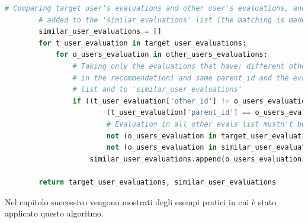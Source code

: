 \begin{itemize}
    \begin{lstlisting}[language=Python, label=lst:UB_CF_4]
        # Comparing target user's evaluations and other user's evaluations, and if there is a match the evaluation is
        # added to the 'similar_evaluations' list (the matching is made comparing the 'parent_id')
        similar_user_evaluations = []
        for t_user_evaluation in target_user_evaluations:
            for o_users_evaluation in other_users_evaluations:
                # Taking only the evaluations that have: different other_id (excluding the target evaluation
                # in the recommendation) and same parent_id and the evaluations that weren't added to 'target_user_evaluations'
                # list and to 'similar_user_evaluations'
                if ((t_user_evaluation['other_id'] != o_users_evaluation['other_id']) and  # Evaluations must have different 'other_id'
                        (t_user_evaluation['parent_id'] == o_users_evaluation['parent_id']) and  # Evaluations must have the same 'parent_id'
                        # Evaluation in all_other_evals list mustn't be already added to \
                        not (o_users_evaluation in target_user_evaluations) and  # the 'target_user_evaluations' list or
                        not (o_users_evaluation in similar_user_evaluations)):  # the 'similar_user_evaluations' list
                    similar_user_evaluations.append(o_users_evaluation)
        
        return target_user_evaluations, similar_user_evaluations
    \end{lstlisting}
\end{itemize}
Nel capitolo successivo vengono mostrati degli esempi pratici in cui è stato applicato questo algoritmo.
%
\newpage
%
